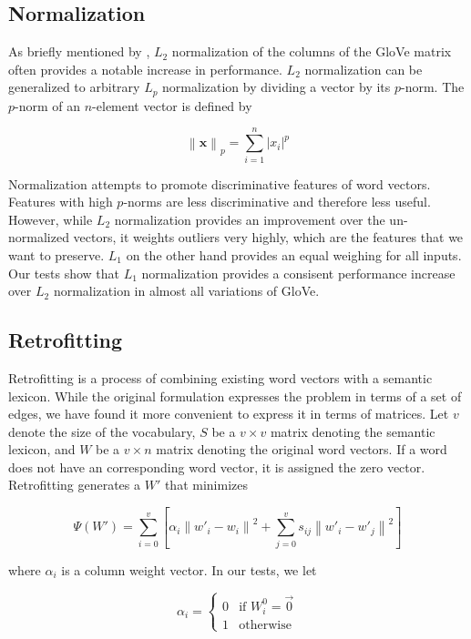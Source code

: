 \documentclass[letterpaper]{article}
\begin{document}
\subsection{Normalization}

As briefly mentioned by , $L_2$ normalization of
the columns of the GloVe matrix often provides a notable increase in
performance. $L_2$ normalization can be generalized to arbitrary
$L_p$ normalization by dividing a vector by its $p$-norm. The $p$-norm of an
$n$-element vector is defined by

$$ \left\|\mathbf{x}\right\|_p
  = \sum_{i=1}^n \left|x_i\right|^p$$

Normalization attempts to promote discriminative features of word vectors.
Features with high $p$-norms are less discriminative and therefore less useful.
However, while $L_2$ normalization provides an improvement over the un-normalized
vectors, it weights outliers very highly, which are the features that we want to
preserve. $L_1$ on the other hand provides an equal weighing for all inputs.
Our tests show that $L_1$ normalization provides a consisent performance
increase over $L_2$ normalization in almost all variations of GloVe.

\subsection{Retrofitting}

Retrofitting \cite{faruqui2014retrofitting} is a process of combining existing word vectors with a semantic
lexicon. While the original formulation expresses the problem in terms of a set
of edges, we have found it more convenient to express it in terms of matrices.
Let $v$ denote the size of the vocabulary, $S$ be a $v \times v$ matrix
denoting the semantic lexicon, and $W$ be a $v \times n$ matrix denoting the
original word vectors. If a word does not have an
corresponding word vector, it is assigned the zero vector. Retrofitting
generates a $W'$ that minimizes

$$
\Psi \left( W' \right) = \sum_{i=0}^v \left[
  \alpha_i \left\|  w'_i - w_i \right\| ^ 2
  + \sum_{j=0}^v s_{ij} \left\| w'_i - w'_j \right\| ^ 2
\right]
$$

where $\alpha_i$ is a column weight vector. In our tests, we let

$$
\alpha_i =
  \begin{cases}
    0 & \text{if $W^0_i = \vec{0}$} \\
    1 & \text{otherwise}
  \end{cases}
$$
\end{document}
